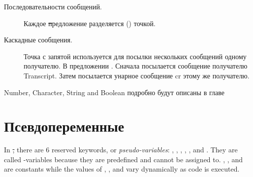 \documentclass[a4paper,10pt,twoside]{book}
\begin{document}
\begin{description}
\item[Последовательности сообщений.]	Каждое \st предложение разделяется () точкой.	

\item[Каскадные сообщения.] Точка с запятой используется для посылки нескольких сообщений одному получателю.
	В предложении .
	Сначала посылается сообщение  получателю Transcript.
	Затем посылается унарное сообщение cr этому же получателю.

\end{description}

Number, Character, String and Boolean подробно будут описаны в главе 


\section{Псевдопеременные}

In \st, there are 6 reserved keywords, or \emph{pseudo-variables}:
, ,  ,  , , and .
They are called -variables because they are predefined and cannot be assigned to.
, , and  are constants while the values of , , and  vary dynamically as code is executed.
\end{document}
